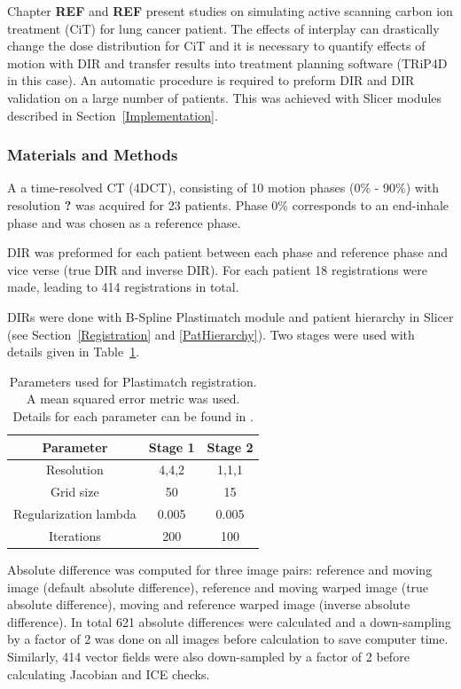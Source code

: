 \documentclass[type=dr, dr=rernat, accentcolor=tud7b,colorbacktitle, bigchapter, openright, twoside, 12pt ]{tudthesis}
\begin{document}
Chapter \textbf{REF} and \textbf{REF} present studies on simulating active scanning carbon ion treatment (CiT) for lung cancer patient. The effects of interplay can drastically change the dose distribution for CiT and it is necessary to quantify effects of motion with DIR and transfer results into
treatment planning software (TRiP4D in this case). An automatic procedure is required to preform DIR and DIR validation on a large number of patients. This was achieved with Slicer modules described in Section~\ref{Implementation}.

\subsubsection{Materials and Methods}

A a time-resolved CT (4DCT), consisting of 10 motion phases (0\% - 90\%) with resolution \textbf{?} was acquired for 23 patients.
Phase 0\% corresponds to an end-inhale phase and was chosen as a reference phase.

DIR was preformed for each patient between each phase and reference phase and vice verse (true DIR and inverse DIR). For each patient 18 registrations were made, leading to 414 registrations in total.

DIRs were done with B-Spline Plastimatch module and patient hierarchy in Slicer (see Section~\ref{Registration} and \ref{PatHierarchy}). Two stages were used with details given in Table~\ref{tab:stages}. 

\begin{table}[H]
  \centering
  \caption{Parameters used for Plastimatch registration. A mean squared error metric was used. Details for each parameter can be found in \cite{Plastimatch}.}
  \begin{tabular}{c|c|c}
      Parameter & Stage 1 & Stage 2 \\
      \hline
      Resolution & 4,4,2 & 1,1,1 \\
      Grid size & 50 & 15 \\
      Regularization lambda & 0.005 & 0.005 \\
      Iterations & 200 & 100 \\
    \hline\hline
  \end{tabular}
  \label{tab:stages}
\end{table}

Absolute difference was computed for three image pairs: reference and moving image (default absolute difference), reference and moving warped image (true absolute difference), moving and reference warped image (inverse absolute difference). In total 621 absolute differences were calculated and a down-sampling by a factor of 2 was
done on all images before calculation to save computer time. Similarly, 414 vector fields were also down-sampled by a factor of 2 before calculating Jacobian and ICE checks.
\end{document}
